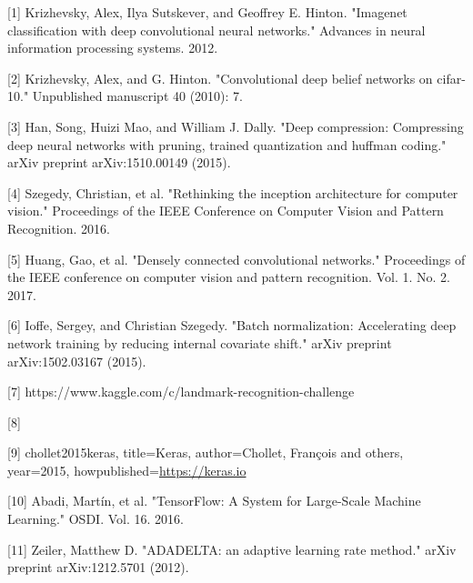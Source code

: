 \documentclass{article}
\begin{document}
[1] Krizhevsky, Alex, Ilya Sutskever, and Geoffrey E. Hinton. "Imagenet classification with deep convolutional neural networks." Advances in neural information processing systems. 2012.

[2] Krizhevsky, Alex, and G. Hinton. "Convolutional deep belief networks on cifar-10." Unpublished manuscript 40 (2010): 7.

[3] Han, Song, Huizi Mao, and William J. Dally. "Deep compression: Compressing deep neural networks with pruning, trained quantization and huffman coding." arXiv preprint arXiv:1510.00149 (2015).

[4] Szegedy, Christian, et al. "Rethinking the inception architecture for computer vision." Proceedings of the IEEE Conference on Computer Vision and Pattern Recognition. 2016.

[5] Huang, Gao, et al. "Densely connected convolutional networks." Proceedings of the IEEE conference on computer vision and pattern recognition. Vol. 1. No. 2. 2017.

[6] Ioffe, Sergey, and Christian Szegedy. "Batch normalization: Accelerating deep network training by reducing internal covariate shift." arXiv preprint arXiv:1502.03167 (2015).

[7] https://www.kaggle.com/c/landmark-recognition-challenge

[8] 

[9] chollet2015keras,
title={Keras},
author={Chollet, Fran\c{c}ois and others},
year={2015},
howpublished={\url{https://keras.io}}

[10] Abadi, Martín, et al. "TensorFlow: A System for Large-Scale Machine Learning." OSDI. Vol. 16. 2016.

[11] Zeiler, Matthew D. "ADADELTA: an adaptive learning rate method." arXiv preprint arXiv:1212.5701 (2012).
\end{document}
